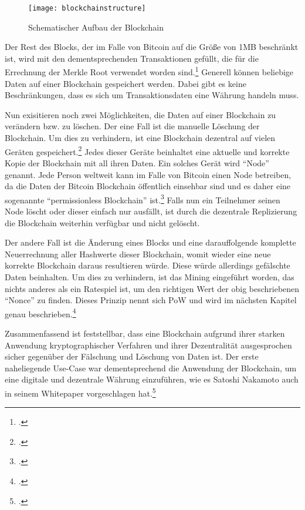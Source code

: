 \begin{figure}[H]
    \caption{Schematischer Aufbau der Blockchain}
    \texttt{[image: blockchainstructure]}
    \label{figure:blockchainstructure}
    \\
    \cite[Quelle: In Anlehnung an][S. 5]{nakamoto2008bitcoin}
\end{figure}

Der Rest des Blocks, der im Falle von Bitcoin auf die Größe von 1MB beschränkt ist, wird mit den dementsprechenden
Transaktionen gefüllt, die für die Errechnung der Merkle Root verwendet worden sind.\footcite[Vgl.][S. 746]{mukhopadhyay2016brief}
Generell können beliebige Daten auf einer Blockchain gespeichert werden. Dabei gibt es keine Beschränkungen, dass
es sich um Transaktionsdaten eine Währung handeln muss.

Nun exisitieren noch zwei Möglichkeiten, die Daten auf einer Blockchain zu verändern bzw. zu löschen. Der eine Fall
ist die manuelle Löschung der Blockchain. Um dies zu verhindern, ist eine Blockchain dezentral auf vielen Geräten
gespeichert.\footcite[Vgl.][S. 46]{bhaskar2015bitcoin} Jedes dieser Geräte beinhaltet eine aktuelle und korrekte Kopie
der Blockchain mit all ihren Daten. Ein solches Gerät wird "`Node"' genannt. Jede Person weltweit kann im Falle von
Bitcoin einen Node betreiben, da die Daten der Bitcoin Blockchain öffentlich einsehbar sind und es daher eine
sogenannte "`permissionless Blockchain"' ist.\footcite[Vgl.][S. 132]{courtois2014optimizing} Falls nun ein Teilnehmer
seinen Node löscht oder dieser einfach nur ausfällt, ist durch die dezentrale Replizierung die Blockchain weiterhin
verfügbar und nicht gelöscht.

Der andere Fall ist die Änderung eines Blocks und eine darauffolgende komplette Neuerrechnung aller Hashwerte dieser
Blockchain, womit wieder eine neue korrekte Blockchain daraus resultieren würde. Diese würde allerdings gefälschte Daten
beinhalten. Um dies zu verhindern, ist das Mining eingeführt worden, das nichts anderes als ein Ratespiel ist, um den
richtigen Wert der obig beschriebenen "`Nonce"' zu finden. Dieses Prinzip nennt sich \ac{PoW} und wird im nächsten Kapitel
genau beschrieben.\footcite[Vgl.][S. 3]{nakamoto2008bitcoin}

Zusammenfassend ist feststellbar, dass eine Blockchain aufgrund ihrer starken Anwendung kryptographischer Verfahren und
ihrer Dezentralität ausgesprochen sicher gegenüber der Fälschung und Löschung von Daten ist. Der erste naheliegende
Use-Case war dementsprechend die Anwendung der Blockchain, um eine digitale und dezentrale Währung einzuführen, wie es
Satoshi Nakamoto auch in seinem Whitepaper vorgeschlagen hat.\footcite[Vgl.][]{nakamoto2008bitcoin}

